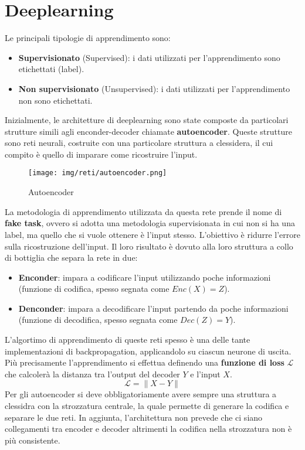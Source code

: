 \chapter{Deeplearning}
Le principali tipologie di apprendimento sono:
\begin{itemize}
      \item \textbf{Supervisionato} (Supervised): i dati utilizzati per l'apprendimento
            sono etichettati (label).
      \item \textbf{Non supervisionato} (Unsupervised): i dati utilizzati per
            l'apprendimento non sono etichettati.
\end{itemize}
Inizialmente, le architetture di deeplearning sono state composte da particolari
strutture simili agli enconder-decoder chiamate \textbf{autoencoder}. Queste
strutture sono reti neurali, costruite con una particolare struttura a clessidera,
il cui compito è quello di imparare come ricostruire l'input.
\begin{figure}[!ht]
      \centering
      \texttt{[image: img/reti/autoencoder.png]}
      \caption{Autoencoder}
      \label{fig:autoencoder}
\end{figure}
La metodologia di apprendimento utilizzata da questa rete prende il nome di
\textbf{fake task}, ovvero si adotta una metodologia supervisionata in cui non si
ha una label, ma quello che si vuole ottenere è l'input stesso. L'obiettivo
è ridurre l'errore sulla ricostruzione dell'input. Il loro risultato è dovuto
alla loro struttura a collo di bottiglia che separa la rete in due:
\begin{itemize}
      \item \textbf{Enconder}: impara a codificare l'input utilizzando poche
            informazioni (funzione di codifica, spesso segnata come $Enc(X) = Z$).
      \item \textbf{Denconder}: impara a decodificare l'input partendo da poche
            informazioni (funzione di decodifica, spesso segnata come $Dec(Z) = Y$).
\end{itemize}
L'algortimo di apprendimento di queste reti spesso è una delle tante implementazioni
di backpropagation, applicandolo su ciascun neurone di uscita. Più precisamente
l'apprendimento si effettua definendo una \textbf{funzione di loss} $\mathcal{L}$
che calcolerà la distanza tra l'output del decoder $Y$ e l'input $X$.
\begin{equation}
      \mathcal{L} = \| X - Y \|
\end{equation}
Per gli autoencoder si deve obbligatoriamente avere sempre una struttura a clessidra
con la strozzatura centrale, la quale permette di generare la codifica e separare
le due reti. In aggiunta, l'architettura non prevede che ci siano collegamenti
tra encoder e decoder altrimenti la codifica nella strozzatura non è più consistente.

